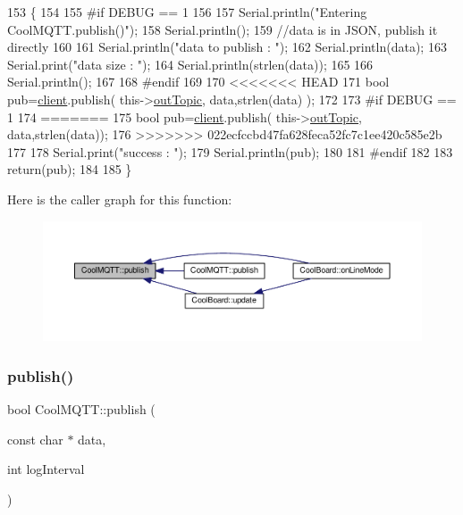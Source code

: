 \begin{DoxyCode}
153 \{
154 
155 \textcolor{preprocessor}{#if DEBUG == 1 }
156 
157     Serial.println(\textcolor{stringliteral}{"Entering CoolMQTT.publish()"});
158     Serial.println();
159     \textcolor{comment}{//data is in JSON, publish it directly}
160 
161     Serial.println(\textcolor{stringliteral}{"data to publish : "});
162     Serial.println(data);
163     Serial.print(\textcolor{stringliteral}{"data size : "});
164     Serial.println(strlen(data));
165 
166     Serial.println();
167 
168 \textcolor{preprocessor}{#endif}
169     
170 <<<<<<< HEAD
171     \textcolor{keywordtype}{bool} pub=\hyperlink{classCoolMQTT_a4ca71e4f76ef868692a297efd45b1415}{client}.publish( this->\hyperlink{classCoolMQTT_a109c786a17b463f9eeba046194279522}{outTopic}, data,strlen(data) );
172 
173 \textcolor{preprocessor}{#if DEBUG == 1 }
174 =======
175     \textcolor{keywordtype}{bool} pub=\hyperlink{classCoolMQTT_a4ca71e4f76ef868692a297efd45b1415}{client}.publish( this->\hyperlink{classCoolMQTT_a109c786a17b463f9eeba046194279522}{outTopic}, data,strlen(data));
176 >>>>>>> 022ecfccbd47fa628feca52fc7c1ee420c585e2b
177     
178     Serial.print(\textcolor{stringliteral}{"success : "});
179     Serial.println(pub);    
180 
181 \textcolor{preprocessor}{#endif}
182 
183     \textcolor{keywordflow}{return}(pub);
184 
185 \}
\end{DoxyCode}
Here is the caller graph for this function\+:
\nopagebreak
\begin{figure}[H]
\begin{center}
\leavevmode
\includegraphics[width=350pt]{classCoolMQTT_ace977b3e90ab14b1199fe5c4fb0a13ec_icgraph}
\end{center}
\end{figure}
\mbox{\label{classCoolMQTT_a65a506641740ce797ceadd4fa8a286d3}} 
\subsubsection{\texorpdfstring{publish()}{publish()}\hspace{0.1cm}{\footnotesize\ttfamily [2/2]}}
{\footnotesize\ttfamily bool Cool\+M\+Q\+T\+T\+::publish (\begin{DoxyParamCaption}\item[{const char $\ast$}]{data,  }\item[{int}]{log\+Interval }\end{DoxyParamCaption})}


